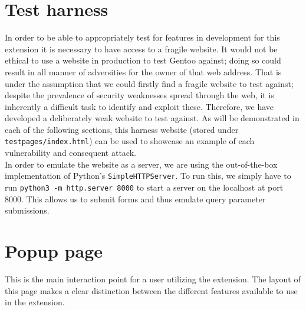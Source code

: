 \section{Test harness}

In order to be able to appropriately test for features in development for this extension it is necessary to have access to a fragile website. It would not be ethical to use a website in production to test Gentoo against; doing so could result in all manner of adversities for the owner of that web address. That is under the assumption that we could firstly find a fragile website to test against; despite the prevalence of security weaknesses spread through the web, it is inherently a difficult task to identify and exploit these. Therefore, we have developed a deliberately weak website to test against. As will be demonstrated in each of the following sections, this harness website (stored under \texttt{testpages/index.html}) can be used to showcase an example of each vulnerability and consequent attack. \\

In order to emulate the website as a server, we are using the out-of-the-box implementation of Python's \texttt{SimpleHTTPServer}. To run this, we simply have to run \texttt{python3 -m http.server 8000} to start a server on the localhost at port 8000. This allows us to submit forms and thus emulate query parameter submissions.

\section{Popup page}

This is the main interaction point for a user utilizing the extension. The layout of this page makes a clear distinction between the different features available to use in the extension. \\

